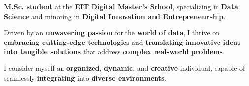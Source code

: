 

\begin{cvparagraph}

\textbf{M.Sc. student} at the \textbf{EIT Digital Master’s School}, specializing in \textbf{Data Science} and minoring in \textbf{Digital Innovation and Entrepreneurship}. 

Driven by an \textbf{unwavering passion }for the \textbf{world of data}, I thrive on \textbf{embracing cutting-edge technologies }and \textbf{translating innovative ideas into tangible solutions }that address \textbf{complex real-world problems}.

I consider myself an \textbf{organized}, \textbf{dynamic}, and \textbf{creative} individual, capable of seamlessly \textbf{integrating} into \textbf{diverse environments}.
\end{cvparagraph}
